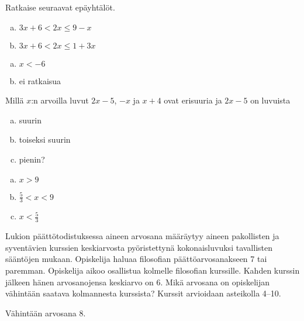 \begin{tehtavasivu}
\begin{tehtava}
    Ratkaise seuraavat epäyhtälöt.
    \begin{enumerate}[a)]
        \item $3x+6<2x\leq 9-x$
        \item $3x+6<2x\leq 1+3x$
    \end{enumerate}
    \begin{vastaus}
        \begin{enumerate}[a)]
            \item $x<-6$
            \item ei ratkaisua
        \end{enumerate}
    \end{vastaus}
\end{tehtava}


\begin{tehtava}
	Millä $x$:n arvoilla luvut $2x - 5$, $-x$ ja $x + 4$ ovat erisuuria ja $2x - 5$ on luvuista
	\begin{enumerate}[a)]
		\item suurin
		\item toiseksi suurin
		\item pienin?
	\end{enumerate}
	\begin{vastaus}
		\begin{enumerate}[a)]
			\item $x > 9$
			\item $\frac{5}{3} < x < 9$
			\item $x < \frac{5}{3}$
		\end{enumerate}
	\end{vastaus}
\end{tehtava}

\begin{tehtava}
Lukion päättötodistuksessa aineen arvosana määräytyy aineen pakollisten ja syventävien kurssien keskiarvosta pyöristettynä kokonaisluvuksi tavallisten 
sääntöjen mukaan. Opiskelija haluaa filosofian päättöarvosanakseen 7 tai paremman. Opiskelija aikoo osallistua kolmelle filosofian kurssille. Kahden 
kurssin jälkeen hänen arvosanojensa keskiarvo on 6. Mikä arvosana on opiskelijan vähintään saatava kolmannesta kurssista? Kurssit arvioidaan asteikolla 
4--10.
\begin{vastaus}
Vähintään arvosana 8.
\end{vastaus}
\end{tehtava}


\end{tehtavasivu}
